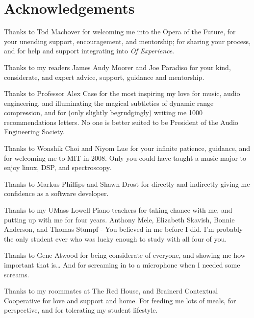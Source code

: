 \clearpage
\chapter*{Acknowledgements}
\label{ch:acknowledgements}
\begin{fullwidth}
\noindent Thanks to Tod Machover for welcoming me into the Opera of
the Future, for your unending support, encouragement, and mentorship; 
for sharing your process, and for help and support
integrating \thesis into \textit{Of Experience}.

\vspace{5mm}
\noindent Thanks to my readers James Andy Moorer and Joe Paradiso for
your kind, considerate, and expert advice, support, guidance and mentorship.

\vspace{5mm}
\noindent Thanks to Professor Alex Case for the most inspiring my love
for music, audio engineering, and illuminating the magical subtleties
of dynamic range compression, and for (only slightly begrudgingly)
writing me 1000 recommendations letters. No one is better suited to be
President of the Audio Engineering Society.

\vspace{5mm}
\noindent Thanks to Wonshik Choi and Niyom Lue for your infinite
patience, guidance, and for welcoming me to MIT in 2008. Only you
could have taught a music major to enjoy linux, DSP, and spectroscopy.

\vspace{5mm}
\noindent Thanks to Markus Phillips and Shawn Drost for directly and indirectly
giving me confidence as a software developer.

\vspace{5mm}
\noindent Thanks to my UMass Lowell Piano teachers for taking chance
with me, and putting up with me for four years. Anthony Mele,
Elizabeth Skavish, Bonnie Anderson, and Thomas Stumpf - You believed
in me before I did. I'm probably the only student ever who was lucky
enough to study with all four of you.

\vspace{5mm}
\noindent  Thanks to Gene Atwood for being considerate of everyone, and showing
me how important that is\ldots{} And for screaming in to a microphone when
I needed some screams.

\vspace{5mm}
\noindent Thanks to my roommates at The Red House, and Brainerd
Contextual Cooperative for love and support and home. For feeding me
lots of meals, for perspective, and for tolerating my student
lifestyle.


\end{fullwidth}
